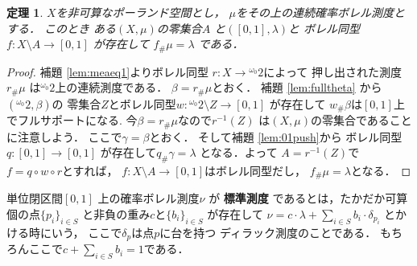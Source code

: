 \documentclass[leqno, 12pt]{jsarticle}
\newtheorem{thm}{定理}
\newcommand{\myomega}{\omega_{0}}
\newcommand{\mycantor}{{}^{\myomega}2}
\newcommand{\myppp}[2]{#1_{\#}#2}
\begin{document}
\begin{thm}\label{thm:probeq0}
$X$を非可算なポーランド空間とし，
$\mu$をその上の連続確率ボレル測度とする．
このとき
ある$(X, \mu)$の零集合$A$
と$([0, 1], \lambda)$と
ボレル同型
$f\colon X\setminus A\to [0, 1]$
が存在して
$\myppp{f}{\mu}=\lambda$
である．
\end{thm}
\begin{proof}
補題 \ref{lem:meaeq1}よりボレル同型
$r\colon X\to \mycantor$によって
押し出された測度$\myppp{r}{\mu}$
は$\mycantor$上の連続測度である．
$\beta=\myppp{r}{\mu}$とおく．
補題 \ref{lem:fulltheta}
から
$(\mycantor, \beta)$の
零集合$Z$とボレル同型$w\colon \mycantor\setminus Z \to [0, 1]$
が存在して
$\myppp{w}{\beta}$は$[0, 1]$上でフルサポートになる.
今$\beta=\myppp{r}{\mu}$なので$r^{-1}(Z)$
は$(X, \mu)$の零集合であることに注意しよう．
ここで$\gamma=\beta$とおく．
そして補題 \ref{lem:01push}から
ボレル同型$q\colon [0, 1]\to [0, 1]$
が存在して$\myppp{q}{\gamma}=\lambda$
となる．よって
$A=r^{-1}(Z)$で
$f=q\circ w\circ r$とすれば，
$f\colon X\setminus A\to [0, 1]$はボレル同型だし，
$\myppp{f}{\mu}=\lambda$となる．
\end{proof}




単位閉区間$[0, 1]$
上の確率ボレル測度$\nu$
が
\textbf{標準測度}
であるとは，たかだか可算個の点$\{p_{i}\}_{i\in S}$
と非負の重み$c$と$\{b_{i}\}_{i\in S}$
が存在して
$\nu=c\cdot \lambda+\sum_{i\in S}b_{i}\cdot \delta_{p_{i}}$
とかける時にいう，
ここで$\delta_{p}$は点$p$に台を持つ
ディラック測度のことである．
もちろんここで$c+\sum_{i\in S}b_{i}=1$である．
\end{document}
